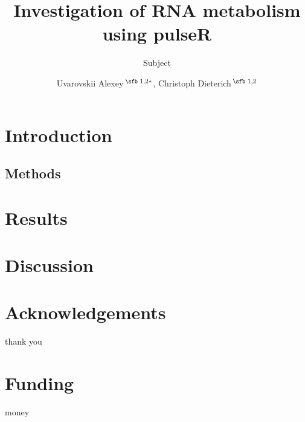 \documentclass{bioinfo}
\begin{document}

\subtitle{Subject}

\title[pulseR package]{Investigation of RNA metabolism using pulseR}
\author[Uvarovskii \textit{et~al}.]{
Uvarovskii Alexey\,$^{\text{\sfb 1,2}*}$,
Christoph Dieterich\,$^{\text{\sfb 1,2}}$ }
\address{$^{\text{\sf 1}}$
Section of Bioinformatics and Systems Cardiology
Klaus Tschira Institute for Integrative Computational Cardiology
Department of Internal Medicine III
University Hospital Heidelberg,   
Im Neuenheimer Feld 669
69120 Heidelberg,
and 
$^{\text{\sf 2}}$
German Center for Cardiovascular Research (DZHK),
Im Neuenheimer Feld 669
69120 Heidelberg
}




\maketitle

\section{Introduction}

\begin{methods}
\section{Methods}

\end{methods}

\section{Results}


\section{Discussion}



\section*{Acknowledgements}
thank you
\section*{Funding}
money	

%
%

%
%
%
%
%

\end{document}
